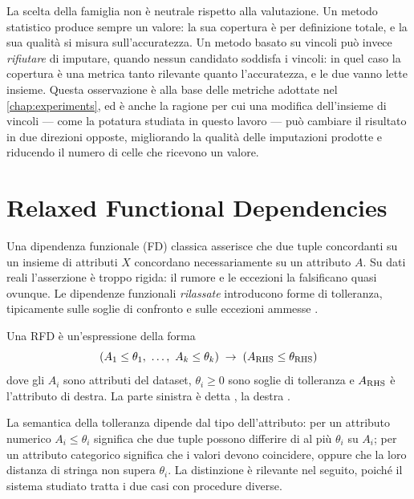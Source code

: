 La scelta della famiglia non è neutrale rispetto alla valutazione. Un metodo statistico produce
sempre un valore: la sua copertura è per definizione totale, e la sua qualità si misura
sull'accuratezza. Un metodo basato su vincoli può invece \emph{rifiutare} di imputare, quando
nessun candidato soddisfa i vincoli: in quel caso la copertura è una metrica tanto rilevante
quanto l'accuratezza, e le due vanno lette insieme. Questa osservazione è alla base delle metriche
adottate nel \autoref{chap:experiments}, ed è anche la ragione per cui una modifica dell'insieme
di vincoli --- come la potatura studiata in questo lavoro --- può cambiare il risultato in due
direzioni opposte, migliorando la qualità delle imputazioni prodotte e riducendo il numero di
celle che ricevono un valore.

\section{Relaxed Functional Dependencies}\label{sec:rfd}

Una dipendenza funzionale (FD) classica asserisce che due tuple concordanti su un insieme di
attributi $X$ concordano necessariamente su un attributo $A$. Su dati reali l'asserzione è troppo
rigida: il rumore e le eccezioni la falsificano quasi ovunque. Le dipendenze funzionali
\emph{rilassate} introducono forme di tolleranza, tipicamente sulle soglie di confronto e sulle
eccezioni ammesse \cite{caruccio2016rfd}.

\begin{definition}\label{def:rfd}
Una RFD è un'espressione della forma
\[
    (A_1 \le \theta_1,\ \dots,\ A_k \le \theta_k) \;\rightarrow\; (A_{\mathrm{RHS}} \le \theta_{\mathrm{RHS}})
\]
dove gli $A_i$ sono attributi del dataset, $\theta_i \ge 0$ sono soglie di tolleranza e
$A_{\mathrm{RHS}}$ è l'attributo di destra. La parte sinistra è detta \LHS{}, la destra \RHS{}.
\end{definition}

La semantica della tolleranza dipende dal tipo dell'attributo: per un attributo numerico
$A_i \le \theta_i$ significa che due tuple possono differire di al più $\theta_i$ su $A_i$; per un
attributo categorico significa che i valori devono coincidere, oppure che la loro distanza di
stringa non supera $\theta_i$. La distinzione è rilevante nel seguito, poiché il sistema studiato
tratta i due casi con procedure diverse.

